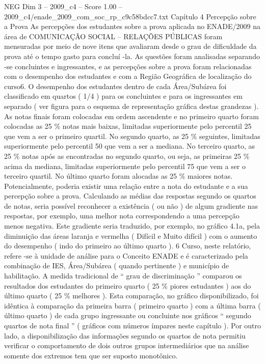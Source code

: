 \begin{textsample}{NEG Dim 3 – 2009\_c4 – Score 1.00 – 2009\_c4/enade\_2009\_com\_soc\_rp\_c9c58bdcc7.txt}  \label{ex:f3_neg_155}
Capítulo 4 Percepção sobre a Prova As percepções dos estudantes sobre a prova aplicada no ENADE/2009 na área de COMUNICAÇÃO SOCIAL – RELAÇÕES PÚBLICAS foram mensuradas por meio de nove itens que avaliaram desde o grau de dificuldade da prova até o tempo gasto para concluí -la.
As questões foram analisadas separando -se concluintes e ingressantes, e as percepções sobre a prova foram relacionadas com o desempenho dos estudantes e com a Região Geográfica de localização do curso6.
O desempenho dos estudantes dentro de cada Área/Subárea foi classificado em quartos ( 1/4 ) para os concluintes e para os ingressantes em separado ( ver figura para o esquema de representação gráfica destas grandezas ).
As notas finais foram colocadas em ordem ascendente e no primeiro quarto foram colocadas as 25 \% notas mais baixas, limitadas superiormente pelo percentil 25 que vem a ser o primeiro quartil.
No segundo quarto, as 25 \% seguintes, limitadas superiormente pelo percentil 50 que vem a ser a mediana.
No terceiro quarto, as 25 \% notas após as encontradas no segundo quarto, ou seja, as primeiras 25 \% acima da mediana, limitadas superiormente pelo percentil 75 que vem a ser o terceiro quartil.
No último quarto foram alocadas as 25 \% maiores notas.
Potencialmente, poderia existir uma relação entre a nota do estudante e a sua percepção sobre a prova.
Calculando as médias das respostas segundo os quartos de notas, seria possível reconhecer a existência ( ou não ) de algum gradiente nas respostas, por exemplo, uma melhor nota correspondendo a uma percepção menos negativa.
Este gradiente seria traduzido, por exemplo, no gráfico 4.1a, pela diminuição das áreas laranja e vermelha ( Difícil e Muito difícil ) com o aumento do desempenho ( indo do primeiro ao último quarto ). 6 Curso, neste relatório, refere -se à unidade de análise para o Conceito ENADE e é caracterizado pela combinação de IES, Área/Subárea ( quando pertinente ) e município de habilitação.
A medida tradicional de “ grau de discriminação ” comparou os resultados dos estudantes do primeiro quarto ( 25 \% piores estudantes ) aos do último quarto ( 25 \% melhores ).
Esta comparação, no gráfico disponibilizado, foi idêntica à comparação da primeira barra ( primeiro quarto ) com a última barra ( último quarto ) de cada grupo ingressante ou concluinte nos gráficos “ segundo quartos de nota final ” ( gráficos com números ímpares neste capítulo ).
Por outro lado, a disponibilização das informações segundo os quartos de nota permitiu verificar o comportamento de dois outros grupos intermediários que na análise somente dos extremos tem que ser suposto monotônico.

\end{textsample}
